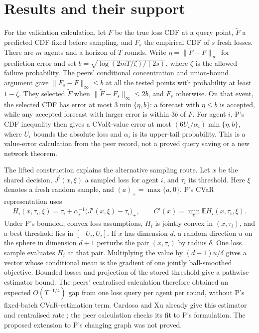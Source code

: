 \documentclass{article}
\begin{document}
\section{Results and their support}

For the validation calculation, let \(F\) be the true loss CDF at a query point, \(\widetilde F\) a predicted
CDF fixed before sampling, and \(F_s\) the empirical CDF of \(s\) fresh losses. There are \(m\) agents and a
horizon of \(T\) rounds. Write \(\eta=\|\widetilde F-F\|_\infty\) for prediction error and set
\(b=\sqrt{\log(2mT/\zeta)/(2s)}\), where \(\zeta\) is the allowed failure probability. The peers' conditional
concentration and union-bound argument gave \(\|F_s-F\|_\infty\le b\) at all the tested points with
probability at least \(1-\zeta\). They selected \(\widetilde F\) when \(\|\widetilde F-F_s\|_\infty\le2b\),
and \(F_s\) otherwise. On that event, the selected CDF has error at most \(3\min\{\eta,b\}\): a forecast with
\(\eta\le b\) is accepted, while any accepted forecast with larger error is within \(3b\) of \(F\). For agent
\(i\), P's CDF inequality then gives a CVaR-value error at most \((6U_i/\alpha_i)\min\{\eta,b\}\), where
\(U_i\) bounds the absolute loss and \(\alpha_i\) is its upper-tail probability. This is a value-error
calculation from the peer record, not a proved query saving or a new network theorem.

The lifted construction explains the alternative sampling route. Let \(x\) be the shared decision,
\(J^i(x,\xi)\) a sampled loss for agent \(i\), and \(\tau_i\) its threshold. Here \(\xi\) denotes a fresh
random sample, and \((a)_+=\max\{a,0\}\). P's CVaR representation uses
\[
H_i(x,\tau_i,\xi)
=\tau_i+\alpha_i^{-1}\bigl(J^i(x,\xi)-\tau_i\bigr)_+,
\qquad
C^i(x)=\min_{\tau_i}\mathbb E H_i(x,\tau_i,\xi).
\]
Under P's bounded, convex loss assumptions, \(H_i\) is jointly convex in \((x,\tau_i)\), and a best threshold
lies in \([-U_i,U_i]\). If \(x\) has dimension \(d\), a random direction \(u\) on the sphere in dimension
\(d+1\) perturbs the pair \((x,\tau_i)\) by radius \(\delta\). One loss sample evaluates \(H_i\) at that pair.
Multiplying the value by \((d+1)u/\delta\) gives a vector whose conditional mean is the gradient of one
jointly ball-smoothed objective. Bounded losses and projection of the stored threshold give a pathwise
estimator bound. The peers' centralised calculation therefore obtained an expected \(O(T^{-1/4})\) gap from
one loss query per agent per round, without P's fixed-batch CVaR-estimation term. Cardoso and Xu already give
this estimator and centralised rate \cite{CardosoXu2019}; the peer calculation checks its fit to P's
formulation. The proposed extension to P's changing graph was not proved.
\end{document}
